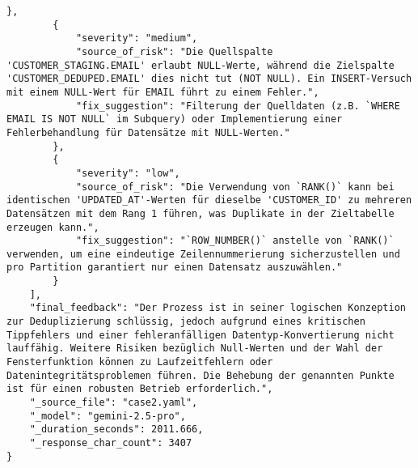 \begin{lstlisting}[caption={Ausgabe: Gemini 2.5 Pro Anwendungsfall 2 Konsistenzdurchlauf},label={gemini_case2_prompt2}]
        },
        {
            "severity": "medium",
            "source_of_risk": "Die Quellspalte 'CUSTOMER_STAGING.EMAIL' erlaubt NULL-Werte, während die Zielspalte 'CUSTOMER_DEDUPED.EMAIL' dies nicht tut (NOT NULL). Ein INSERT-Versuch mit einem NULL-Wert für EMAIL führt zu einem Fehler.",
            "fix_suggestion": "Filterung der Quelldaten (z.B. `WHERE EMAIL IS NOT NULL` im Subquery) oder Implementierung einer Fehlerbehandlung für Datensätze mit NULL-Werten."
        },
        {
            "severity": "low",
            "source_of_risk": "Die Verwendung von `RANK()` kann bei identischen 'UPDATED_AT'-Werten für dieselbe 'CUSTOMER_ID' zu mehreren Datensätzen mit dem Rang 1 führen, was Duplikate in der Zieltabelle erzeugen kann.",
            "fix_suggestion": "`ROW_NUMBER()` anstelle von `RANK()` verwenden, um eine eindeutige Zeilennummerierung sicherzustellen und pro Partition garantiert nur einen Datensatz auszuwählen."
        }
    ],
    "final_feedback": "Der Prozess ist in seiner logischen Konzeption zur Deduplizierung schlüssig, jedoch aufgrund eines kritischen Tippfehlers und einer fehleranfälligen Datentyp-Konvertierung nicht lauffähig. Weitere Risiken bezüglich Null-Werten und der Wahl der Fensterfunktion können zu Laufzeitfehlern oder Datenintegritätsproblemen führen. Die Behebung der genannten Punkte ist für einen robusten Betrieb erforderlich.",
    "_source_file": "case2.yaml",
    "_model": "gemini-2.5-pro",
    "_duration_seconds": 2011.666,
    "_response_char_count": 3407
}
\end{lstlisting}

